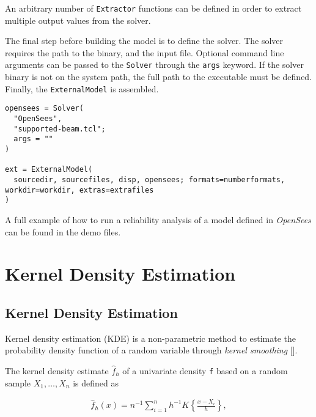 An arbitrary number of \texttt{Extractor} functions can be defined in order to extract multiple output values from the solver.



The final step before building the model is to define the solver. The solver requires the path to the binary, and the input file. Optional command line arguments can be passed to the \texttt{Solver} through the \texttt{args} keyword. If the solver binary is not on the system path, the full path to the executable must be defined. Finally, the \texttt{ExternalModel} is assembled.




\begin{verbatim}
opensees = Solver(
  "OpenSees",
  "supported-beam.tcl";
  args = ""
)

ext = ExternalModel(
  sourcedir, sourcefiles, disp, opensees; formats=numberformats, workdir=workdir, extras=extrafiles
)
\end{verbatim}



A full example of how to run a reliability analysis of a model defined in \emph{OpenSees} can be found in the demo files.



\chapter{Kernel Density Estimation}


\section{Kernel Density Estimation}



\label{6883224486742304299}{}


Kernel density estimation (KDE) is a non-parametric method to estimate the probability density function of a random variable through \emph{kernel smoothing} [].



The kernel density estimate \(\hat{f}_h\) of a univariate density \texttt{f} based on a random sample \(X_1,\ldots,X_n\) is defined as



\begin{equation*}
\begin{split}\hat{f}_h(x) = n^{-1} \sum_{i=1}^n h^{-1} K \left\{\frac{x-X_i}{h}\right\},\end{split}\end{equation*}


